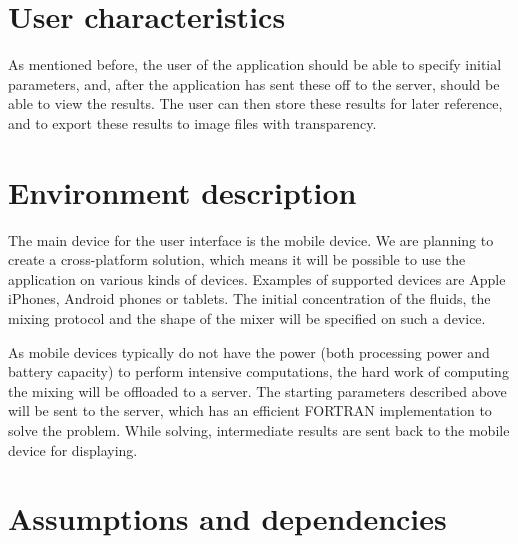 \section{User characteristics}
As mentioned before, the user of the application should be able to specify initial parameters, and, after the application has sent these off to the server, should be able to view the results. The user can then store these results for later reference, and to export these results to image files with transparency.

\section{Environment description}
The main device for the user interface is the mobile device. We are planning to create a cross-platform solution, which means it will be possible to use the application on various kinds of devices. Examples of supported devices are Apple iPhones, Android phones or tablets. The initial concentration of the fluids, the mixing protocol and the shape of the mixer will be specified on such a device.

As mobile devices typically do not have the power (both processing power and battery capacity) to perform intensive computations, the hard work of computing the mixing will be offloaded to a server. The starting parameters described above will be sent to the server, which has an efficient FORTRAN implementation to solve the problem. While solving, intermediate results are sent back to the mobile device for displaying.

\section{Assumptions and dependencies}
